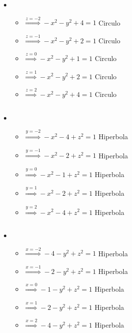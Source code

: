 \documentclass[../practica_02.tex]{subfiles}
\begin{document}
\begin{enumerate}
\begin{enumerate}
                    \begin{itemize}
                        \item
                            \begin{itemize}
                                \item $\stackrel{z=-2}{\Rightarrow} - x^2 - y^2 + 4 = 1 $ Circulo
                                \item $\stackrel{z=-1}{\Rightarrow} - x^2 - y^2 + 2 = 1 $ Circulo
                                \item $\stackrel{z=0}{\Rightarrow}  - x^2 - y^2 + 1 = 1 $ Circulo
                                \item $\stackrel{z=1}{\Rightarrow}  - x^2 - y^2 + 2 = 1 $ Circulo
                                \item $\stackrel{z=2}{\Rightarrow}  - x^2 - y^2 + 4 = 1 $ Circulo
                            \end{itemize}

                        $ $

                        \item
                            \begin{itemize}
                                \item $\stackrel{y=-2}{\Rightarrow} - x^2 - 4 + z^2 = 1 $ Hiperbola
                                \item $\stackrel{y=-1}{\Rightarrow} - x^2 - 2 + z^2 = 1 $ Hiperbola
                                \item $\stackrel{y=0}{\Rightarrow}  - x^2 - 1 + z^2 = 1 $ Hiperbola
                                \item $\stackrel{y=1}{\Rightarrow}  - x^2 - 2 + z^2 = 1 $ Hiperbola
                                \item $\stackrel{y=2}{\Rightarrow}  - x^2 - 4 + z^2 = 1 $ Hiperbola
                            \end{itemize}

                            $ $

                        \item
                            \begin{itemize}
                                \item $\stackrel{x=-2}{\Rightarrow} - 4 - y^2 + z^2 = 1 $ Hiperbola
                                \item $\stackrel{x=-1}{\Rightarrow} - 2 - y^2 + z^2 = 1 $ Hiperbola
                                \item $\stackrel{x=0}{\Rightarrow}  - 1 - y^2 + z^2 = 1 $ Hiperbola
                                \item $\stackrel{x=1}{\Rightarrow}  - 2 - y^2 + z^2 = 1 $ Hiperbola
                                \item $\stackrel{x=2}{\Rightarrow}  - 4 - y^2 + z^2 = 1 $ Hiperbola
                            \end{itemize}


\end{itemize}
\end{enumerate}
\end{enumerate}
\end{document}
